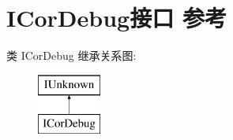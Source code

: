 \hypertarget{interface_i_cor_debug}{}\section{I\+Cor\+Debug接口 参考}
\label{interface_i_cor_debug}
类 I\+Cor\+Debug 继承关系图\+:\begin{figure}[H]
\begin{center}
\leavevmode
\includegraphics[height=2.000000cm]{interface_i_cor_debug}
\end{center}
\end{figure}
